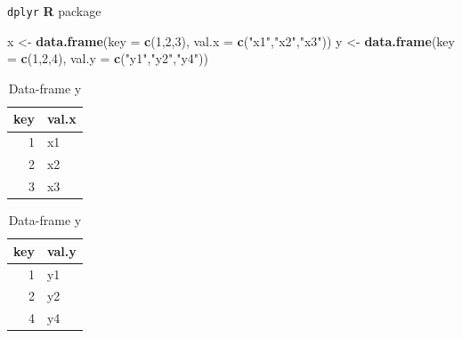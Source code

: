 \documentclass[ignorenonframetext,]{beamer}
\newenvironment{Shaded}{\begin{snugshade}}{\end{snugshade}}
\newcommand{\KeywordTok}[1]{\textcolor[rgb]{0.13,0.29,0.53}{\textbf{#1}}}
\newcommand{\DataTypeTok}[1]{\textcolor[rgb]{0.13,0.29,0.53}{#1}}
\newcommand{\DecValTok}[1]{\textcolor[rgb]{0.00,0.00,0.81}{#1}}
\newcommand{\StringTok}[1]{\textcolor[rgb]{0.31,0.60,0.02}{#1}}
\newcommand{\NormalTok}[1]{#1}
\let\oldShaded\Shaded
\let\endoldShaded\endShaded
\renewenvironment{Shaded}{\footnotesize\oldShaded}{\endoldShaded}
\begin{document}
\begin{frame}[fragile]{\texttt{dplyr} \textbf{R} package}

\begin{Shaded}
\begin{Highlighting}[]
\NormalTok{x <-}\StringTok{ }\KeywordTok{data.frame}\NormalTok{(}\DataTypeTok{key =} \KeywordTok{c}\NormalTok{(}\DecValTok{1}\NormalTok{,}\DecValTok{2}\NormalTok{,}\DecValTok{3}\NormalTok{), }\DataTypeTok{val.x =} \KeywordTok{c}\NormalTok{(}\StringTok{"x1"}\NormalTok{,}\StringTok{"x2"}\NormalTok{,}\StringTok{"x3"}\NormalTok{))}
\NormalTok{y <-}\StringTok{ }\KeywordTok{data.frame}\NormalTok{(}\DataTypeTok{key =} \KeywordTok{c}\NormalTok{(}\DecValTok{1}\NormalTok{,}\DecValTok{2}\NormalTok{,}\DecValTok{4}\NormalTok{), }\DataTypeTok{val.y =} \KeywordTok{c}\NormalTok{(}\StringTok{"y1"}\NormalTok{,}\StringTok{"y2"}\NormalTok{,}\StringTok{"y4"}\NormalTok{))}
\end{Highlighting}
\end{Shaded}

\begin{table}[!htb]
    \begin{minipage}{.5\linewidth}
      \caption*{Data-frame x}
      \centering 
\begin{tabular}{rl}
\toprule
key & val.x\\
\midrule
1 & x1\\
2 & x2\\
3 & x3\\
\bottomrule
\end{tabular} \end{minipage}%
    \begin{minipage}{.5\linewidth}
      \centering
        \caption*{Data-frame y} 
\begin{tabular}{rl}
\toprule
key & val.y\\
\midrule
1 & y1\\
2 & y2\\
4 & y4\\
\bottomrule
\end{tabular} \end{minipage} 
\end{table}

\end{frame}
\end{document}
